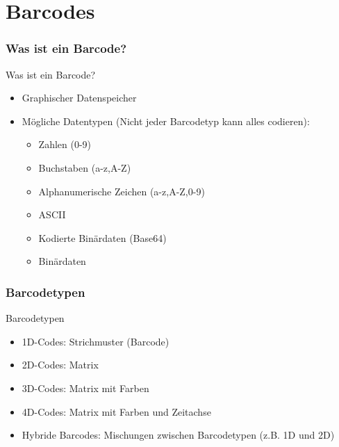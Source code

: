 \part{Barcodes}


\section{Was ist ein Barcode?}
\begin{frame}[<+->]{Was ist ein Barcode?}
	\begin{itemize}
	\pause
	\item Graphischer Datenspeicher
	\item Mögliche Datentypen (Nicht jeder Barcodetyp kann alles codieren):
		\begin{itemize}
		\item Zahlen (0-9)
		\item Buchstaben (a-z,A-Z)
		\item Alphanumerische Zeichen (a-z,A-Z,0-9)
		\item ASCII
		\item Kodierte Binärdaten (Base64)
		\item Binärdaten
		\end{itemize}
	\end{itemize}
\end{frame}

\section{Barcodetypen}

\begin{frame}[<+->]{Barcodetypen}
		\begin{itemize}
		\item 1D-Codes: Strichmuster (Barcode)
		\item 2D-Codes: Matrix
		\item 3D-Codes: Matrix mit Farben
		\item 4D-Codes: Matrix mit Farben und Zeitachse
		\item Hybride Barcodes: Mischungen zwischen Barcodetypen (z.B. 1D und 2D)
		\end{itemize}
\end{frame}

